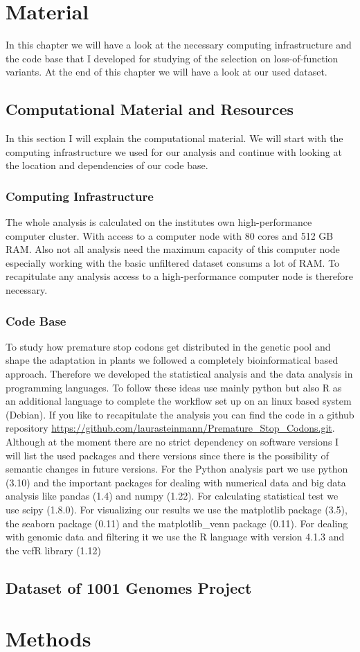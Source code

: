 \chapter{Material}
In this chapter we will have a look at the necessary computing infrastructure and the code base that I developed for studying of the selection on loss-of-function variants. At the end of this chapter we will have a look at our used dataset.
\section{Computational Material and Resources}
In this section I will explain the computational material. We will start with the computing infrastructure we used for our analysis and continue with looking at the location and dependencies of our code base.
\subsection{Computing Infrastructure}
The whole analysis is calculated on the institutes own high-performance computer cluster. With access to a computer node with 80 cores and 512 GB RAM. Also not all analysis need the maximum capacity of this computer node especially working with the basic unfiltered dataset consums a lot of RAM. To recapitulate any analysis access to a high-performance computer node is therefore necessary. 
\subsection{Code Base}
To study how premature stop codons get distributed in the genetic pool and shape the adaptation in plants we followed a completely bioinformatical based approach. Therefore we developed the statistical analysis and the data analysis in programming languages. To follow these ideas use mainly python but also R as an additional language to complete the workflow set up on an linux based system (Debian). If you like to recapitulate the analysis you can find the code in a github repository \url{https://github.com/laurasteinmann/Premature_Stop_Codons.git}.\\
Although at the moment there are no strict dependency on software versions I will list the used packages and there versions since there is the possibility of semantic changes in future versions. For the Python analysis part we use python (3.10) and the important packages for dealing with numerical data and big data analysis like pandas (1.4) and  numpy (1.22). For calculating statistical test we use scipy (1.8.0). For visualizing our results we use the matplotlib package (3.5), the seaborn package (0.11) and the matplotlib\_venn package (0.11). For dealing with genomic data and filtering it we use the R language with version 4.1.3 and the vcfR library (1.12)
\section{Dataset of 1001 Genomes Project}
\chapter{Methods}